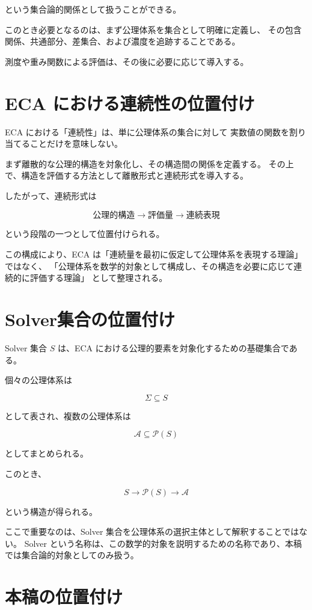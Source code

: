 \documentclass[12pt,a4paper]{article}
\begin{document}
という集合論的関係として扱うことができる。

このとき必要となるのは、まず公理体系を集合として明確に定義し、
その包含関係、共通部分、差集合、および濃度を追跡することである。

測度や重み関数による評価は、その後に必要に応じて導入する。

\section{ECA における連続性の位置付け}

ECA における「連続性」は、単に公理体系の集合に対して
実数値の関数を割り当てることだけを意味しない。

まず離散的な公理的構造を対象化し、その構造間の関係を定義する。
その上で、構造を評価する方法として離散形式と連続形式を導入する。

したがって、連続形式は

\[
\text{公理的構造}
\longrightarrow
\text{評価量}
\longrightarrow
\text{連続表現}
\]

という段階の一つとして位置付けられる。

この構成により、ECA は「連続量を最初に仮定して公理体系を表現する理論」ではなく、
「公理体系を数学的対象として構成し、その構造を必要に応じて連続的に評価する理論」
として整理される。

\section{Solver集合の位置付け}

Solver 集合 $S$ は、ECA における公理的要素を対象化するための基礎集合である。

個々の公理体系は

\[
\Sigma\subseteq S
\]

として表され、複数の公理体系は

\[
\mathscr{A}\subseteq\mathcal{P}(S)
\]

としてまとめられる。

このとき、

\[
S
\longrightarrow
\mathcal{P}(S)
\longrightarrow
\mathscr{A}
\]

という構造が得られる。

ここで重要なのは、Solver 集合を公理体系の選択主体として解釈することではない。
Solver という名称は、この数学的対象を説明するための名称であり、本稿では集合論的対象としてのみ扱う。

\section{本稿の位置付け}
\end{document}
